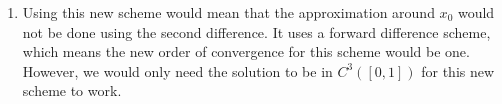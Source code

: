\documentclass[a4paper,11pt]{article}
\theoremstyle{plain} %
\theoremstyle{definition} %
\theoremstyle{remark} %
\begin{document}
\begin{enumerate}
\item Using this new scheme would mean that the approximation around $x_0$ would not be done using the second difference. It uses a forward difference scheme, which means the new order of convergence for this scheme would be one. However, we would only need the solution to be in $C^3([0,1])$ for this new scheme to work.
\end{enumerate}
\end{document}
